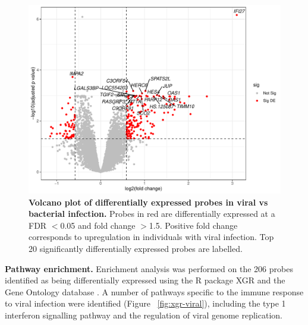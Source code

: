 \FloatBarrier
\begin{figure}[htbp]
\centering
\includegraphics[width=\textwidth]{./Results3/Images/vp-viral-bacterial.pdf}
\caption[Volcano plot of differentially expressed probes in viral infection]{\textbf{Volcano plot of differentially expressed probes in viral vs bacterial infection.} Probes in red are differentially expressed at a FDR $<$0.05 and fold change $>$1.5. Positive fold change corresponds to upregulation in individuals with viral infection. Top 20 significantly differentially expressed probes are labelled.}
\label{fig:vp-viral-bacterial}
\end{figure}
\FloatBarrier

\textbf{Pathway enrichment.} Enrichment analysis was performed on the 206 probes identified as being differentially expressed using the R package XGR \parencite{Fang2016} and the Gene Ontology database \parencite{GO2019} \parencite{Ashburner2000}. A number of pathways specific to the immune response to viral infection were identified (Figure ~\ref{fig:xgr-viral}), including the type 1 interferon signalling pathway and the regulation of viral genome replication.

